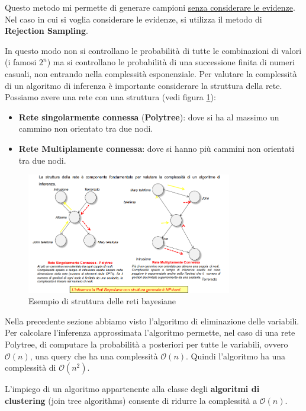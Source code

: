 Questo metodo mi permette di generare campioni \underline{senza considerare le
    evidenze}. Nel caso in cui si voglia considerare le evidenze, si utilizza il
metodo di \textbf{Rejection Sampling}.

In questo modo non si controllano le probabilità di tutte le combinazioni di valori
(i famosi $2^n$) ma si controllano le probabilità di una successione finita di
numeri casuali, non entrando nella complessità esponenziale.
Per valutare la complessità di un algoritmo di inferenza è importante considerare
la struttura della rete. Possiamo avere una rete con una struttura (vedi figura
\ref{fig:struttura_reti}):
\begin{itemize}
    \item \textbf{Rete singolarmente connessa} (\textbf{Polytree}): dove si ha al
          massimo un cammino non orientato tra due nodi.
    \item \textbf{Rete Multiplamente connessa}: dove si hanno più cammini non
          orientati tra due nodi.
\end{itemize}

\begin{figure}[!h]
    \centering
    \includegraphics[width=0.8\textwidth]{img/Reti/struttura_reti_bayesiane.png}
    \caption{Esempio di struttura delle reti bayesiane}
    \label{fig:struttura_reti}
\end{figure}

Nella precedente sezione abbiamo visto l'algoritmo di eliminazione delle
variabili. Per calcolare l'inferenza approssimata l'algoritmo permette, nel caso
di una rete Polytree, di computare la probabilità a posteriori per tutte le
variabili, ovvero $\mathcal{O}(n)$, una query che ha una complessità $\mathcal{O}(n)$.
Quindi l'algoritmo ha una complessità di $\mathcal{O}(n^2)$.

L'impiego di un algoritmo appartenente alla classe degli \textbf{algoritmi di
    clustering} (join tree algorithms) consente di ridurre la complessità a $\mathcal{O}(n)$.

